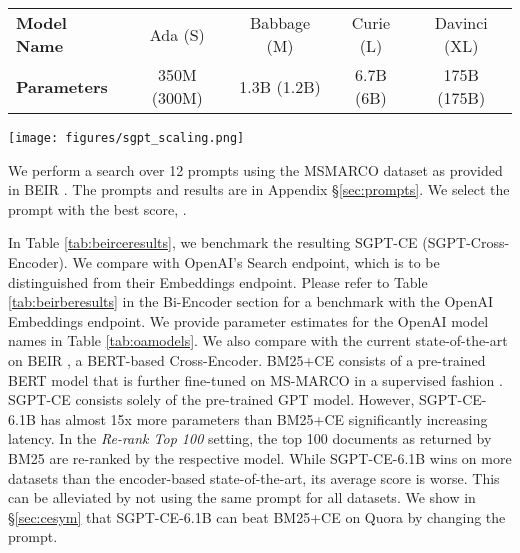 \documentclass{article}
\begin{document}
\begin{table*}[t]
    \centering
    \begin{tabular}{lcccc}
    \toprule
    \textbf{Model Name} & Ada (S) & Babbage (M) & Curie (L) & Davinci (XL)
    \\
    \textbf{Parameters} & 350M (300M) & 1.3B (1.2B) & 6.7B (6B) & 175B (175B)
    \\
    \bottomrule
    \end{tabular}
    \vspace{10pt}
    \caption{OpenAI model parameter estimates. Based on comparing the embedding sizes from the OpenAI docs with the dimensions provided in \cite{brown2020language}. In brackets are numbers for cpt-text models recently provided in \cite{neelakantan2022text}. They differ likely due to removing the language modeling head.}
    \label{tab:oamodels}
\end{table*}


\begin{figure*}[t]
    \centering
    \begin{center}
\texttt{[image: figures/sgpt\_scaling.png]}
        \caption{Scaling behavior across parameters and re-ranking for SGPT-CE on BEIR. Scores are rescaled nDCG@10 based on bounds defined in Appendix \S\ref{sec:results}. Dataset labels are ordered by the \textit{Max Re-rank=100} 6.1B performance. The higher on the y-axis, the more bottlenecked is the Cross-Encoder by BM25's performance. Average scores include MS MARCO.}
\label{fig:sgptscaling}
    \end{center}
\end{figure*}



We perform a search over 12 prompts using the MSMARCO \cite{nguyen2016ms} dataset as provided in BEIR \cite{thakur2021beir}. The prompts and results are in Appendix \S\ref{sec:prompts}. We select the prompt with the best score, .

In Table \ref{tab:beirceresults}, we benchmark the resulting SGPT-CE (SGPT-Cross-Encoder). We compare with OpenAI's Search endpoint, which is to be distinguished from their Embeddings endpoint. Please refer to Table \ref{tab:beirberesults} in the Bi-Encoder section for a benchmark with the OpenAI Embeddings endpoint. We provide parameter estimates for the OpenAI model names in Table \ref{tab:oamodels}. We also compare with the current state-of-the-art on BEIR \cite{thakur2021beir}, a BERT-based Cross-Encoder. BM25+CE consists of a pre-trained BERT model that is further fine-tuned on MS-MARCO \cite{nguyen2016ms} in a supervised fashion \cite{thakur2021beir}. SGPT-CE consists solely of the pre-trained GPT model. However, SGPT-CE-6.1B has almost 15x more parameters than BM25+CE significantly increasing latency. In the \textit{Re-rank Top 100} setting, the top 100 documents as returned by BM25 are re-ranked by the respective model. While SGPT-CE-6.1B wins on more datasets than the encoder-based state-of-the-art, its average score is worse. This can be alleviated by not using the same prompt  for all datasets. We show in \S\ref{sec:cesym} that SGPT-CE-6.1B can beat BM25+CE on Quora by changing the prompt.
\end{document}
